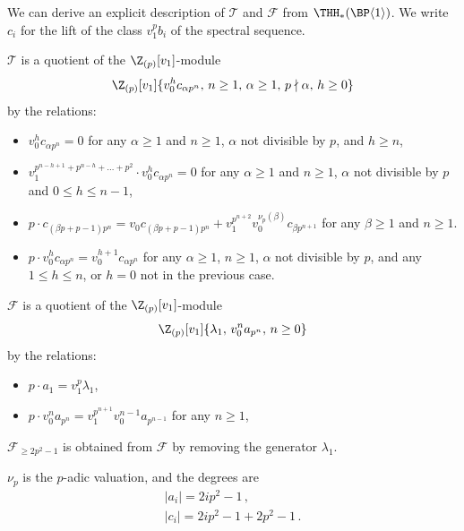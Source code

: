 \begin{remark}
  We can derive an explicit description of $\mathcal{T}$  and $\mathcal{F}$ from $\THH_*(\BP \langle 1 \rangle)$. We write $c_i$ for the lift of the class $v_1^p b_i$ of the spectral sequence.

  $\mathcal{T}$ is a quotient of the $\Z_{(p)}[v_1]$-module
  \[
    \Z_{(p)}[v_1]\{v_0^h c_{\alpha p^n
    },\, n\geq 1,\, \alpha\geq 1,\, p\nmid \alpha,\, h \geq 0\}
  \]
  by the relations:
  \begin{itemize}
  \item $v_0^{h} c_{\alpha p^n} = 0$ for any $\alpha \geq 1$ and $n \geq 1$, $\alpha$ not divisible by $p$, and $h \geq n$,
  \item $v_1^{p^{n-h+1}+p^{n-h}+\dots+p^2 }\cdot v_0^h c_{\alpha p^n} = 0$ for any $\alpha \geq 1$ and $n \geq 1$, $\alpha$ not divisible by $p$ and  $0 \leq h \leq n - 1$,
  \item $p\cdot c_{(\beta p+p-1)p^n} = v_0 c_{(\beta p+p-1)p^n}+v_1^{p^{n+2}}v_0^{\nu_p(\beta)} c_{\beta p^{n+1}}$ for any $\beta \geq 1$ and $n \geq 1$.
  \item $p\cdot v_0^h c_{\alpha p^n} = v_0^{h+1} c_{\alpha p^n}$ for any $\alpha \geq 1$, $n \geq 1$, $\alpha$ not divisible by $p$, and any $1 \leq h \leq n$, or $h=0$ not in the previous case.
  \end{itemize}

  $\mathcal{F}$ is a quotient of the $\Z_{(p)}[v_1]$-module
  \[
    \Z_{(p)}[v_1]\{\lambda_1,\, v_0^n a_{p^n},\,n\geq 0\} 
  \]
    by the relations:
  \begin{itemize}
  \item $p\cdot a_1 = v_1^p \lambda_1$,
  \item $p\cdot v_0^n a_{p^n} = v_1^{p^{n+1}}v_0^{n-1} a_{p^{n-1}}$ for any $n\geq 1$,
  \end{itemize}
  $\mathcal{F}_{\geq 2p^2 -1}$ is obtained from $\mathcal{F}$ by removing the generator $\lambda_1$.

  $\nu_p$ is the $p$-adic valuation, and the degrees are
  \[
    \begin{gathered}
      |a_i| = 2ip^2 - 1 \,, \\
      |c_i| = 2ip^2 - 1 + 2p^2 - 1 \,.
    \end{gathered}
  \]
\end{remark}


